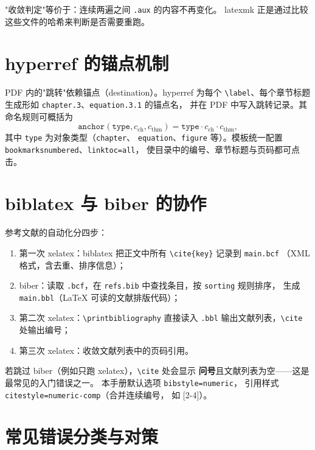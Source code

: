 "收敛判定"等价于：连续两遍之间 \texttt{.aux} 的内容不再变化。
latexmk 正是通过比较这些文件的哈希来判断是否需要重跑。

\section{hyperref 的锚点机制}

PDF 内的"跳转"依赖锚点（destination）。hyperref 为每个
\verb|\label|、每个章节标题生成形如
\texttt{chapter.3}、\texttt{equation.3.1} 的锚点名，
并在 PDF 中写入跳转记录。其命名规则可概括为
\begin{equation}
  \texttt{anchor}(\texttt{type}, c_{\mathrm{ch}}, c_{\mathrm{thm}})
  = \texttt{type} \cdot c_{\mathrm{ch}} \cdot c_{\mathrm{thm}},
\end{equation}
其中 \texttt{type} 为对象类型（\texttt{chapter}、
\texttt{equation}、\texttt{figure} 等）。模板统一配置
\texttt{bookmarksnumbered}、\texttt{linktoc=all}，
使目录中的编号、章节标题与页码都可点击。

\section{biblatex 与 biber 的协作}

参考文献的自动化分四步：

\begin{enumerate}
  \item 第一次 xelatex：biblatex 把正文中所有
        \verb|\cite{key}| 记录到 \texttt{main.bcf}
        （XML 格式，含去重、排序信息）；
  \item biber：读取 \texttt{.bcf}，在 \texttt{refs.bib}
        中查找条目，按 \texttt{sorting} 规则排序，
        生成 \texttt{main.bbl}（LaTeX 可读的文献排版代码）；
  \item 第二次 xelatex：\verb|\printbibliography| 直接读入
        \texttt{.bbl} 输出文献列表，\verb|\cite| 处输出编号；
  \item 第三次 xelatex：收敛文献列表中的页码引用。
\end{enumerate}

若跳过 biber（例如只跑 xelatex），\verb|\cite| 处会显示
\textbf{问号}且文献列表为空——这是最常见的入门错误之一。
本手册默认选项 \texttt{bibstyle=numeric}，
引用样式 \texttt{citestyle=numeric-comp}（合并连续编号，
如 [2-4]）。

\section{常见错误分类与对策}

